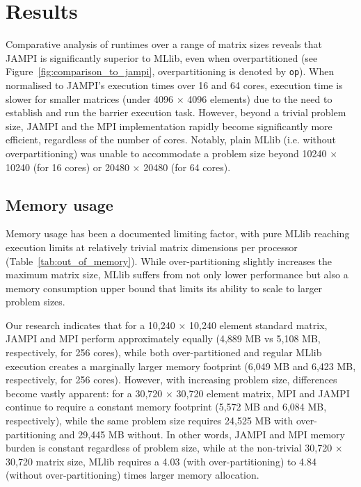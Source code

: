 \documentclass[fleqn,10pt]{SelfArx} %
\begin{document}

\section{Results} %
\label{sec:results}

Comparative analysis of runtimes over a range of matrix sizes reveals that JAMPI is significantly superior to MLlib, even when overpartitioned (see Figure~\ref{fig:comparison_to_jampi}, overpartitioning is denoted by \texttt{op}). When normalised to JAMPI's execution times over 16 and 64 cores, execution time is slower for smaller matrices (under 4096 $\times$ 4096 elements) due to the need to establish and run the barrier execution task. However, beyond a trivial problem size, JAMPI and the MPI implementation rapidly become significantly more efficient, regardless of the number of cores. Notably, plain MLlib (i.e. without overpartitioning) was unable to accommodate a problem size beyond 10240 $\times$ 10240 (for 16 cores) or 20480 $\times$ 20480 (for 64 cores).

\subsection{Memory usage} %
\label{sub:memory_usage}

Memory usage has been a documented limiting factor, with pure MLlib reaching execution limits at relatively trivial matrix dimensions per processor (Table~\ref{tab:out_of_memory}). While over-partitioning slightly increases the maximum matrix size, MLlib suffers from not only lower performance but also a memory consumption upper bound that limits its ability to scale to larger problem sizes.

Our research indicates that for a 10,240 $\times$ 10,240 element standard matrix, JAMPI and MPI perform approximately equally (4,889 MB vs 5,108 MB, respectively, for 256 cores), while both over-partitioned and regular MLlib execution creates a marginally larger memory footprint (6,049 MB and 6,423 MB, respectively, for 256 cores).  However, with increasing problem size, differences become vastly apparent: for a 30,720 $\times$ 30,720 element matrix, MPI and JAMPI continue to require a constant memory footprint (5,572 MB and 6,084 MB, respectively), while the same problem size requires 24,525 MB with over-partitioning and 29,445 MB without. In other words, JAMPI and MPI memory burden is constant regardless of problem size, while at the non-trivial 30,720 $\times$ 30,720 matrix size, MLlib requires a 4.03 (with over-partitioning) to 4.84 (without over-partitioning) times larger memory allocation.
\end{document}
